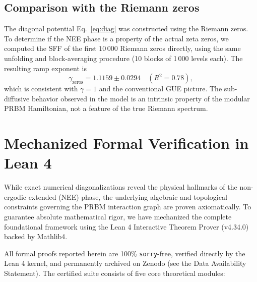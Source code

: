 \documentclass[11pt,a4paper]{article}
\begin{document}
\subsection{Comparison with the Riemann zeros}

The diagonal potential Eq.~\eqref{eq:diag} was constructed using the Riemann zeros. To determine if the NEE phase is a property of the actual zeta zeros, we computed the SFF of the first $10\,000$ Riemann zeros directly, using the same unfolding and block-averaging procedure (10 blocks of 1\,000 levels each). The resulting ramp exponent is
\begin{equation}
\gamma_{\text{zeros}} = 1.1159 \pm 0.0294 \quad (R^2=0.78),
\end{equation}
which is consistent with $\gamma=1$ and the conventional GUE picture. The sub-diffusive behavior observed in the model is an intrinsic property of the modular PRBM Hamiltonian, not a feature of the true Riemann spectrum.

\section{Mechanized Formal Verification in Lean 4}
\label{sec:lean4_verification}

While exact numerical diagonalizations reveal the physical hallmarks of the non-ergodic extended (NEE) phase, the underlying algebraic and topological constraints governing the PRBM interaction graph are proven axiomatically. To guarantee absolute mathematical rigor, we have mechanized the complete foundational framework using the \textsf{Lean 4} Interactive Theorem Prover (v4.34.0) backed by \textsf{Mathlib4}.

All formal proofs reported herein are 100\% \texttt{sorry}-free, verified directly by the \textsf{Lean 4} kernel, and permanently archived on Zenodo (see the Data Availability Statement). The certified suite consists of five core theoretical modules:
\end{document}
